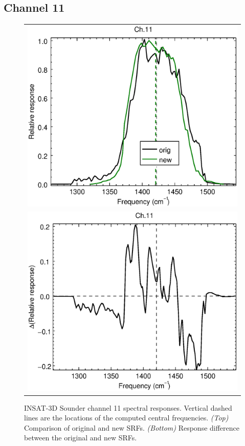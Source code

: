 \subsection{Channel 11}
\begin{figure}[H]
  \centering
  \begin{tabular}{c}
    \includegraphics[scale=0.55]{graphics/sndr/srf/sndr_insat3d-11.eps} \\
    \includegraphics[scale=0.55]{graphics/sndr/srf/sndr_insat3d-11.difference.eps}
  \end{tabular}
  \caption{INSAT-3D Sounder channel 11 spectral responses. Vertical dashed lines are the locations of the computed central frequencies. \emph{(Top)} Comparison of original and new SRFs. \emph{(Bottom)} Response difference between the original and new SRFs.}
  \label{fig:sndr_ch11}
\end{figure}

